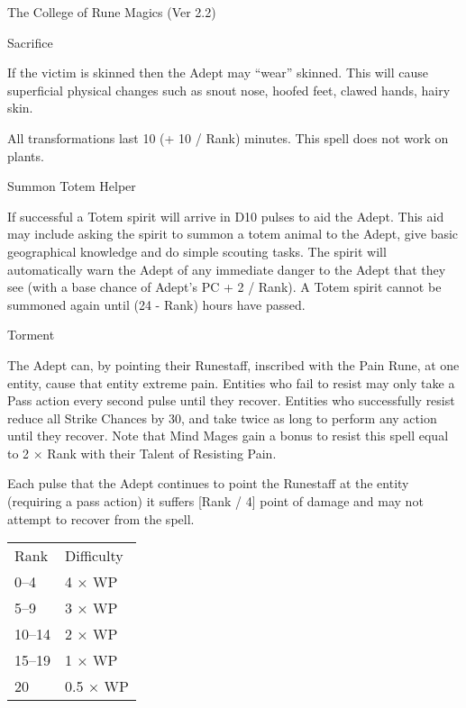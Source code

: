 \begin{Chapter}{The College of Rune Magics (Ver 2.2)}
\begin{spell}[S-12]{Sacrifice}
\begin{effects}
If the victim is skinned then the Adept may “wear” skinned.  This will
cause superficial physical changes such as snout nose, hoofed feet,
clawed hands, hairy skin.

All transformations last 10 (+ 10 / Rank) minutes.  This spell does
not work on plants.
\end{effects}
\end{spell}

\begin{spell}[S-13]{Summon Totem Helper}

\begin{effects}
If successful a Totem spirit will arrive in D10 pulses to aid the
Adept. This aid may include asking the spirit to summon a totem animal
to the Adept, give basic geographical knowledge and do simple scouting
tasks.  The spirit will automatically warn the Adept of any immediate
danger to the Adept that they see (with a base chance of Adept’s PC +
2 / Rank).  A Totem spirit cannot be summoned again until (24 - Rank)
hours have passed.
\end{effects}
\end{spell}

\begin{spell}[S-14]{Torment}

\begin{effects}
The Adept can, by pointing their Runestaff, inscribed with the Pain
Rune, at one entity, cause that entity extreme pain. Entities who fail
to resist may only take a Pass action every second pulse until they
recover.  Entities who successfully resist reduce all Strike Chances
by 30, and take twice as long to perform any action until they
recover.  Note that Mind Mages gain a bonus to resist this spell equal
to 2 × Rank with their Talent of Resisting Pain.

Each pulse that the Adept continues to point the Runestaff at the
entity (requiring a pass action) it suffers [Rank / 4] point of damage
and may not attempt to recover from the spell.

\begin{tabularx}{\columnwidth}{lX}
Rank	& Difficulty \\
0--4	& 4 × WP \\
5--9	& 3 × WP \\
10--14	& 2 × WP \\
15–19	& 1 × WP \\
20	& 0.5 × WP \\
\end{tabularx}
\end{effects}
\end{spell}


\end{Chapter}
